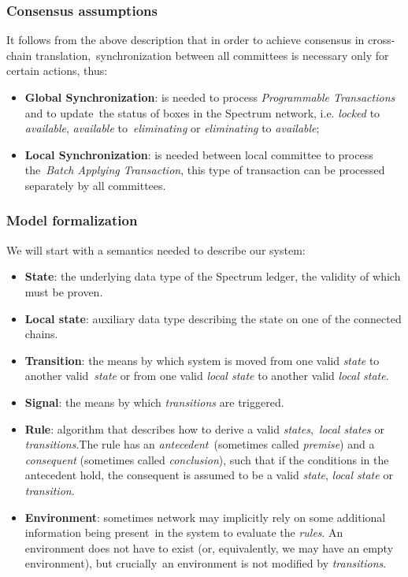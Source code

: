 \subsubsection{Consensus assumptions}
It follows from the above description that in order to achieve consensus in cross-chain translation,\
synchronization between all committees is necessary only for certain actions, thus:
\begin{itemize}
    \item \textbf{Global Synchronization}: is needed to process \textit{Programmable Transactions} and to update\
    the status of boxes in the Spectrum network, i.e. \textit{locked} to \textit{available}, \textit{available} to\
    \textit{eliminating} or \textit{eliminating} to \textit{available};
    \item \textbf{Local Synchronization}: is needed between local committee to process the\
    \textit{Batch Applying Transaction}, this type of transaction can be processed separately by all committees.
\end{itemize}

\subsubsection{Model formalization}
We will start with a semantics needed to describe our system:
\begin{itemize}
    \item \textbf{State}: the underlying data type of the Spectrum ledger, the validity of which must be proven.

    \item \textbf{Local state}: auxiliary data type describing the state on one of the connected chains.

    \item \textbf{Transition}: the means by which system is moved from one valid \textit{state} to another valid\
    \textit{state} or from one valid \textit{local state} to another valid \textit{local state}.

    \item \textbf{Signal}: the means by which \textit{transitions} are triggered.

    \item \textbf{Rule}: algorithm that describes how to derive a valid \textit{states},\
    \textit{local states} or \textit{transitions}.The rule has an \textit{antecedent}\
    (sometimes called \textit{premise}) and a
    \textit{consequent} (sometimes called \textit{conclusion}), such that if the
    conditions in the antecedent hold, the consequent is assumed to be a valid
    \textit{state}, \textit{local state} or \textit{transition}.

    \item \textbf{Environment}: sometimes network may implicitly rely on some additional information being present\
    in the system to evaluate the \textit{rules}.
    An environment does not have to exist (or, equivalently, we may have an empty environment), but crucially\
    an environment is not modified by \textit{transitions}.
\end{itemize}


